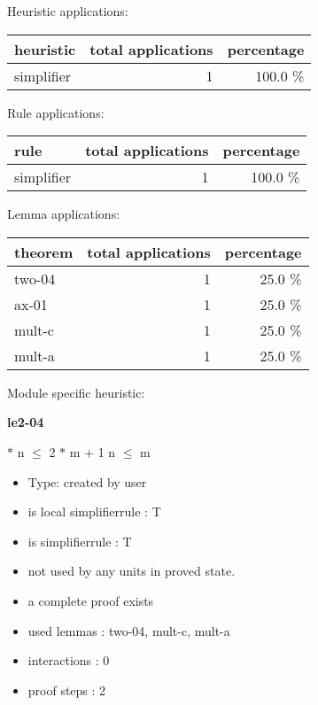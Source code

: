 \documentclass[a4paper]{article}
\begin{document}
\medskip


Heuristic applications:

\begin{supertabular}{l|r|r}
heuristic	& total applications & percentage \\ \hline
simplifier & 1 & 100.0 \% \\

\end{supertabular}

Rule applications:

\begin{supertabular}{l|r|r}
rule	        & total applications & percentage \\ \hline
simplifier & 1 & 100.0 \% \\

\end{supertabular}

Lemma applications:

\begin{supertabular}{l|r|r}
theorem	        & total applications & percentage \\ \hline
two-04 & 1 & 25.0 \% \\
ax-01 & 1 & 25.0 \% \\
mult-c & 1 & 25.0 \% \\
mult-a & 1 & 25.0 \% \\

\end{supertabular}

Module specific heuristic:

\pagebreak

{\LARGE\bf le2-04}\label{lemma-le2-04}

\medskip

  $*$ n $\le$ 2 $*$ m + 1 \Equiv n $\le$ m

\begin{itemize}

\item Type: created by user

\item is local simplifierrule : T
\item is simplifierrule : T
\item not used by any units in proved state.
\item       a complete proof exists
\item       used lemmas  : two-04, mult-c, mult-a
\item       interactions : 0
\item       proof steps  : 2
\end{itemize}
\end{document}
